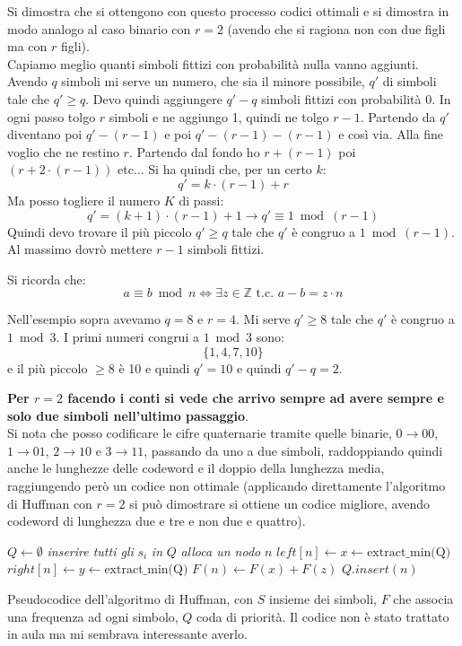 \documentclass[a4paper,12pt, oneside]{book}
\begin{document}
Si dimostra che si ottengono con questo processo codici ottimali e si dimostra
in modo analogo al caso binario con $r=2$ (avendo che si ragiona non con due
figli ma con $r$ figli).\\
Capiamo meglio quanti simboli fittizi con probabilità nulla vanno aggiunti.
Avendo $q$ simboli mi serve un numero, che sia il minore possibile, $q'$ di
simboli tale che $q'\geq q$. Devo quindi aggiungere $q'-q$ simboli fittizi con
probabilità 0. In ogni passo tolgo $r$ simboli e ne aggiungo 1, quindi ne tolgo
$r-1$. Partendo da $q'$ diventano poi $q'-(r-1)$ e poi $q'-(r-1)-(r-1)$ e così
via. Alla fine voglio che ne restino $r$. Partendo dal fondo ho $r+(r-1)$ poi
$(r+2\cdot (r-1))$ etc$\ldots$ Si ha quindi che, per un certo $k$:
\[q'=k\cdot(r-1)+r\]
Ma posso togliere il numero $K$ di passi:
\[q'=(k+1)\cdot (r-1)+1\to q' \equiv 1\bmod (r-1)\]
Quindi devo trovare il più piccolo $q'\geq q$ tale che $q'$ è congruo a $1\bmod
(r-1)$. Al massimo dovrò mettere $r-1$ simboli fittizi.
\begin{shaded}
  Si ricorda che:
  \[a\equiv b\bmod n\iff \exists z\in\mathbb{Z}\mbox{ t.c. }a-b=z\cdot n\]
\end{shaded}
\begin{esempio}
  Nell'esempio sopra avevamo $q=8$ e $r=4$. Mi serve $q'\geq 8$ tale che $q'$ è
  congruo a $1\bmod 3$. I primi numeri congrui a $1\bmod 3$ sono:
  \[\{1,4,7,10\}\]
  e il più piccolo $\geq 8$ è 10 e quindi $q'=10$ e quindi $q'-q=2$. 
\end{esempio}
\textbf{Per $r=2$ facendo i conti si vede che arrivo sempre ad avere sempre e
  solo due simboli nell'ultimo passaggio}.\\
Si nota che posso codificare le cifre quaternarie tramite quelle binarie, $0\to
00$, $1\to 01$, $2\to 10$ e $3\to 11$, passando da uno a due simboli,
raddoppiando quindi anche le lunghezze delle codeword e il doppio della
lunghezza media, raggiungendo però un codice non ottimale (applicando
direttamente l'algoritmo di Huffman con $r=2$ si può dimostrare si ottiene un
codice migliore, avendo codeword di lunghezza due e tre e non due e quattro).\\
\begin{algorithm}
  \begin{algorithmic}
    \State $Q\gets \emptyset$
    \State \textit{inserire tutti gli} $s_i$ \textit{in} $Q$
    \State \textit{alloca un nodo} $n$
    \State $left[n]\gets x\gets\mbox{extract\_min(Q)}$
    \State $right[n]\gets y\gets \mbox{extract\_min(Q)}$
    \State $F(n)\gets F(x)+F(z)$
    \State $Q.insert(n)$
    \EndFor
    \EndFunction
  \end{algorithmic}
  \caption{Pseudocodice dell'algoritmo di Huffman, con $S$ insieme dei simboli,
  $F$ che associa una frequenza ad ogni simbolo, $Q$ coda di priorità. Il codice
  non è stato trattato in aula ma mi sembrava interessante averlo.}
\end{algorithm}
\end{document}
